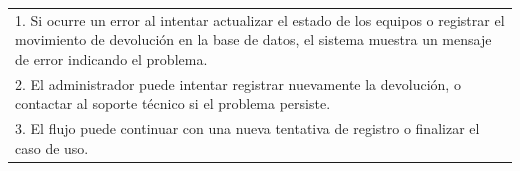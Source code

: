 \documentclass[stu, 12pt, letterpaper, donotrepeattitle, floatsintext, natbib]{apa7}
\begin{document}
\begin{longtable}{@{} p{16.5cm} @{}}
    \hspace{1cm}1. Si ocurre un error al intentar actualizar el estado de los equipos o registrar el movimiento de devoluci\'on en la base de datos, el sistema muestra un mensaje de error indicando el problema.                       \\
    \hspace{1cm}2. El administrador puede intentar registrar nuevamente la devoluci\'on, o contactar al soporte t\'ecnico si el problema persiste.                                                                                       \\
    \hspace{1cm}3. El flujo puede continuar con una nueva tentativa de registro o finalizar el caso de uso.                                                                                                                              \\ \bottomrule
\end{longtable}
\newpage
\end{document}
